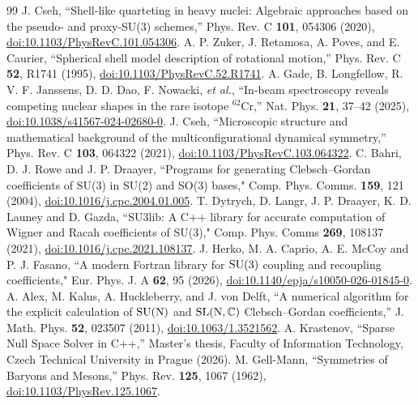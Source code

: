 \documentclass[aps,onecolumn,10pt,superscriptaddress,floatfix,nofootinbib]{revtex4}
\begin{document}
\begin{thebibliography}{99}
 J. Cseh, ``Shell-like quarteting in heavy nuclei: Algebraic approaches based on the pseudo- and proxy-SU(3) schemes,'' Phys. Rev. C \textbf{101}, 054306 (2020), \href{https://doi.org/10.1103/PhysRevC.101.054306}{doi:10.1103/PhysRevC.101.054306}.
 A. P. Zuker, J. Retamosa, A. Poves, and E. Caurier, ``Spherical shell model description of rotational motion,'' Phys. Rev. C \textbf{52}, R1741 (1995), \href{https://doi.org/10.1103/PhysRevC.52.R1741}{doi:10.1103/PhysRevC.52.R1741}.
 A. Gade, B. Longfellow, R. V. F. Janssens, D. D. Dao, F. Nowacki, \textit{et al.}, ``In-beam spectroscopy reveals competing nuclear shapes in the rare isotope $^{62}\mathrm{Cr}$,'' Nat. Phys. \textbf{21}, 37--42 (2025), \href{https://doi.org/10.1038/s41567-024-02680-0}{doi:10.1038/s41567-024-02680-0}.
 J. Cseh, ``Microscopic structure and mathematical background of the multiconfigurational dynamical symmetry,'' Phys. Rev. C \textbf{103}, 064322 (2021), \href{https://doi.org/10.1103/PhysRevC.103.064322}{doi:10.1103/PhysRevC.103.064322}.
 C. Bahri, D. J. Rowe and J. P. Draayer, ``Programs for generating Clebsch–Gordan coefficients of SU(3) in SU(2) and SO(3) bases," Comp. Phys. Comms. \textbf{159}, 121 (2004), \href{https://doi.org/10.1016/j.cpc.2004.01.005}{doi:10.1016/j.cpc.2004.01.005}.
 T. Dytrych, D. Langr, J. P. Draayer, K. D. Launey and D. Gazda, ``SU3lib: A C++ library for accurate computation of Wigner and Racah coefficients of SU(3)," Comp. Phys. Comms \textbf{269}, 108137 (2021), \href{https://doi.org/10.1016/j.cpc.2021.108137}{doi:10.1016/j.cpc.2021.108137}.
 J. Herko, M. A. Caprio, A. E. McCoy and P. J. Fasano, ``A modern Fortran library for $\rm SU(3)$ coupling and recoupling coefficients,"  Eur. Phys. J. A \textbf{62}, 95 (2026), \href{https://doi.org/10.1140/epja/s10050-026-01845-0}{doi:10.1140/epja/s10050-026-01845-0}.
 A. Alex, M. Kalus, A. Huckleberry, and J. von Delft, ``A numerical algorithm for the explicit calculation of $\rm SU(N)$ and $\rm SL(N,\mathbb{C})$ Clebsch--Gordan coefficients,'' J. Math. Phys. \textbf{52}, 023507 (2011), \href{https://doi.org/10.1063/1.3521562}{doi:10.1063/1.3521562}.
 A. Krastenov, ``Sparse Null Space Solver in C++,'' Master's thesis, Faculty of Information Technology, Czech Technical University in Prague (2026).
 M. Gell-Mann, ``Symmetries of Baryons and Mesons,'' Phys. Rev. \textbf{125}, 1067 (1962), \href{https://doi.org/10.1103/PhysRev.125.1067}{doi:10.1103/PhysRev.125.1067}.

\end{thebibliography}
\end{document}
